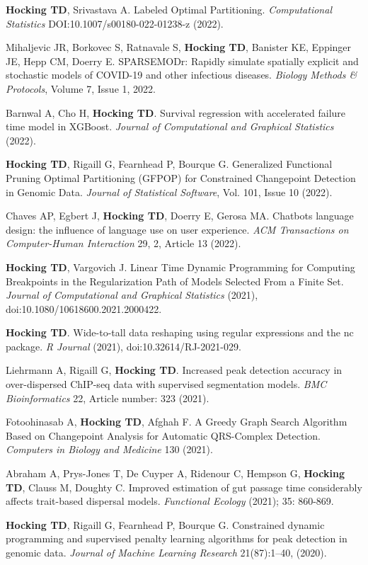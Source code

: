 \documentclass[margin,line]{res}
\begin{document}
\begin{resume}
{\bf Hocking TD}, Srivastava A. Labeled Optimal Partitioning. {\it
  Computational Statistics} DOI:10.1007/s00180-022-01238-z (2022).

Mihaljevic JR, Borkovec S, Ratnavale S, \textbf{Hocking TD}, Banister
KE, Eppinger JE, Hepp CM, Doerry E. SPARSEMODr: Rapidly simulate
spatially explicit and stochastic models of COVID-19 and other
infectious diseases. {\it Biology Methods \& Protocols}, Volume 7,
Issue 1, 2022.

Barnwal A, Cho H, {\bf Hocking TD}. Survival regression with
accelerated failure time model in XGBoost. {\it Journal of
  Computational and Graphical Statistics} (2022).

{\bf Hocking TD}, Rigaill G, Fearnhead P, Bourque G. Generalized
Functional Pruning Optimal Partitioning (GFPOP) for Constrained
Changepoint Detection in Genomic Data. {\it Journal of Statistical
  Software}, Vol. 101, Issue 10 (2022).

Chaves AP, Egbert J, {\bf Hocking TD}, Doerry E, Gerosa MA. Chatbots
language design: the influence of language use on user
experience. {\it ACM Transactions on Computer-Human Interaction} 29,
2, Article 13 (2022).

{\bf Hocking TD}, Vargovich J. Linear Time Dynamic Programming for
Computing Breakpoints in the Regularization Path of Models Selected
From a Finite Set. {\it Journal of Computational and Graphical
  Statistics} (2021), doi:10.1080/10618600.2021.2000422.

{\bf Hocking TD}. Wide-to-tall data reshaping using regular
expressions and the nc package. {\it R Journal} (2021),
doi:10.32614/RJ-2021-029.

Liehrmann A, Rigaill G, {\bf Hocking TD}. Increased peak detection
accuracy in over-dispersed ChIP-seq data with supervised segmentation
models. {\it BMC Bioinformatics} 22, Article number: 323 (2021).

Fotoohinasab A, {\bf Hocking TD}, Afghah F. A Greedy Graph Search
Algorithm Based on Changepoint Analysis for Automatic QRS-Complex
Detection. {\it Computers in Biology and Medicine} 130 (2021).

Abraham A, Prys-Jones T, De Cuyper A, Ridenour C, Hempson G, {\bf
  Hocking TD}, Clauss M, Doughty C. Improved estimation of gut passage
time considerably affects trait-based dispersal models. {\it
  Functional Ecology} (2021); 35: 860-869.

{\bf Hocking TD}, Rigaill G, Fearnhead P, Bourque G. Constrained
dynamic programming and supervised penalty learning algorithms for
peak detection in genomic data. {\it Journal of Machine Learning
  Research} 21(87):1--40, (2020).


\end{resume}
\end{document}
